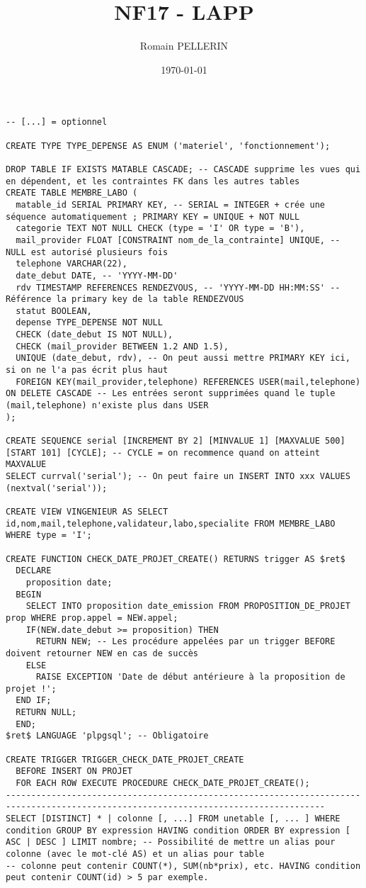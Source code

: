 \documentclass[11pt,a4paper,oneside,french,svgnames]{report}
\title{NF17 - LAPP}
\author{Romain PELLERIN}
\date\today
\newcommand{\code}[2]{\lstset{
  language=#2,
  title={{\setlength{\fboxsep}{1pt}\fcolorbox{orange}{yellow!20}{\sffamily\scriptsize
              \textcolor{gray!10}{\_}{#1}\textcolor{gray!10}{\_}}}}
  }
}
\begin{document}
\scriptsize

\code{SQL (postgresql)}{SQL}
\begin{lstlisting}
-- [...] = optionnel

CREATE TYPE TYPE_DEPENSE AS ENUM ('materiel', 'fonctionnement');

DROP TABLE IF EXISTS MATABLE CASCADE; -- CASCADE supprime les vues qui en dépendent, et les contraintes FK dans les autres tables
CREATE TABLE MEMBRE_LABO (                                                        
  matable_id SERIAL PRIMARY KEY, -- SERIAL = INTEGER + crée une séquence automatiquement ; PRIMARY KEY = UNIQUE + NOT NULL
  categorie TEXT NOT NULL CHECK (type = 'I' OR type = 'B'),
  mail_provider FLOAT [CONSTRAINT nom_de_la_contrainte] UNIQUE, -- NULL est autorisé plusieurs fois
  telephone VARCHAR(22),
  date_debut DATE, -- 'YYYY-MM-DD'
  rdv TIMESTAMP REFERENCES RENDEZVOUS, -- 'YYYY-MM-DD HH:MM:SS' -- Référence la primary key de la table RENDEZVOUS
  statut BOOLEAN,
  depense TYPE_DEPENSE NOT NULL
  CHECK (date_debut IS NOT NULL),
  CHECK (mail_provider BETWEEN 1.2 AND 1.5),
  UNIQUE (date_debut, rdv), -- On peut aussi mettre PRIMARY KEY ici, si on ne l'a pas écrit plus haut
  FOREIGN KEY(mail_provider,telephone) REFERENCES USER(mail,telephone) ON DELETE CASCADE -- Les entrées seront supprimées quand le tuple (mail,telephone) n'existe plus dans USER                     
);

CREATE SEQUENCE serial [INCREMENT BY 2] [MINVALUE 1] [MAXVALUE 500] [START 101] [CYCLE]; -- CYCLE = on recommence quand on atteint MAXVALUE
SELECT currval('serial'); -- On peut faire un INSERT INTO xxx VALUES (nextval('serial'));

CREATE VIEW VINGENIEUR AS SELECT id,nom,mail,telephone,validateur,labo,specialite FROM MEMBRE_LABO WHERE type = 'I';

CREATE FUNCTION CHECK_DATE_PROJET_CREATE() RETURNS trigger AS $ret$
  DECLARE
    proposition date;
  BEGIN
    SELECT INTO proposition date_emission FROM PROPOSITION_DE_PROJET prop WHERE prop.appel = NEW.appel;
    IF(NEW.date_debut >= proposition) THEN
      RETURN NEW; -- Les procédure appelées par un trigger BEFORE doivent retourner NEW en cas de succès
    ELSE
      RAISE EXCEPTION 'Date de début antérieure à la proposition de projet !';
  END IF;
  RETURN NULL;
  END;
$ret$ LANGUAGE 'plpgsql'; -- Obligatoire

CREATE TRIGGER TRIGGER_CHECK_DATE_PROJET_CREATE
  BEFORE INSERT ON PROJET
  FOR EACH ROW EXECUTE PROCEDURE CHECK_DATE_PROJET_CREATE();
-------------------------------------------------------------------------------------------------------------------------------------
SELECT [DISTINCT] * | colonne [, ...] FROM unetable [, ... ] WHERE condition GROUP BY expression HAVING condition ORDER BY expression [ ASC | DESC ] LIMIT nombre; -- Possibilité de mettre un alias pour colonne (avec le mot-clé AS) et un alias pour table
-- colonne peut contenir COUNT(*), SUM(nb*prix), etc. HAVING condition peut contenir COUNT(id) > 5 par exemple.


\end{lstlisting}
\end{document}
